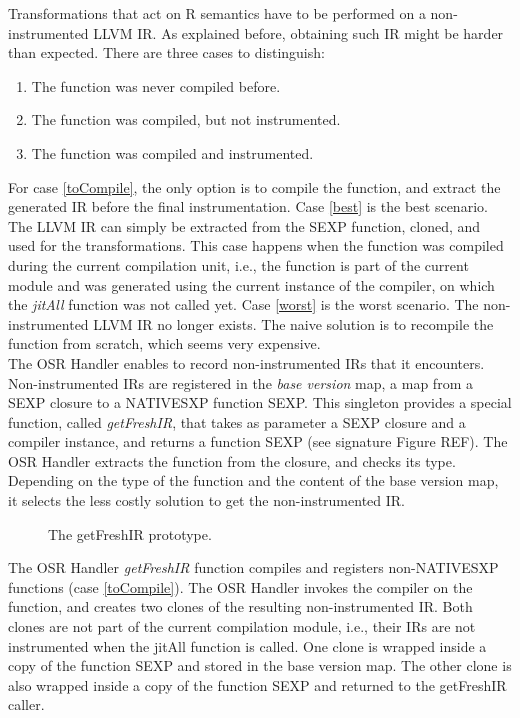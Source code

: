 Transformations that act on R semantics have to be performed on a non-instrumented LLVM IR.
As explained before, obtaining such IR might be harder than expected. 
There are three cases to distinguish:
\begin{enumerate}
    \item The function was never compiled before.\label{toCompile}
    \item The function was compiled, but not instrumented.\label{best} 
    \item The function was compiled and instrumented.\label{worst}
\end{enumerate}

For case \ref{toCompile}, the only option is to compile the function, and extract the generated IR before the final instrumentation.
Case \ref{best} is the best scenario.
The LLVM IR can simply be extracted from the SEXP function, cloned, and used for the transformations.
This case happens when the function was compiled during the current compilation unit, i.e., the function is part of the current module and was generated using the current instance of the compiler, on which the \textit{jitAll} function was not called yet.
Case \ref{worst} is the worst scenario.
The non-instrumented LLVM IR no longer exists.
The naive solution is to recompile the function from scratch, which seems very expensive.\\

The OSR Handler enables to record non-instrumented IRs that it encounters.
Non-instrumented IRs are registered in the \textit{base version} map, a map from a SEXP closure to a NATIVESXP function SEXP.
This singleton provides a special function, called \textit{getFreshIR}, that takes as parameter a SEXP closure and a compiler instance, and returns a function SEXP (see signature Figure REF).
The OSR Handler extracts the function from the closure, and checks its type.
Depending on the type of the function and the content of the base version map, it selects the less costly solution to get the non-instrumented IR.\\

\begin{figure}[h]
\caption{The getFreshIR prototype.}
\label{fig:getfreshir}
\end{figure}

The OSR Handler \textit{getFreshIR} function compiles and registers non-NATIVESXP functions (case \ref{toCompile}).
The OSR Handler invokes the compiler on the function, and creates two clones of the resulting non-instrumented IR.
Both clones are not part of the current compilation module, i.e., their IRs are not instrumented when the jitAll function is called.
One clone is wrapped inside a copy of the function SEXP and stored in the base version map.
The other clone is also wrapped inside a copy of the function SEXP and returned to the getFreshIR caller.\\

